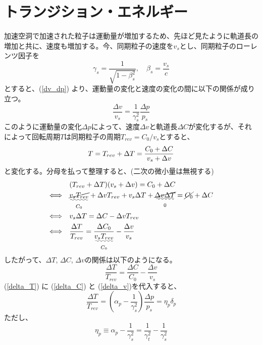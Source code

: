\documentclass[10pt,a4paper]{jlreq}
\begin{document}
\section{トランジション・エネルギー}
加速空洞で加速された粒子は運動量が増加するため、先ほど見たように軌道長の増加と共に、速度も増加する。今、同期粒子の速度を$v_s$とし、同期粒子のローレンツ因子を
%
\begin{equation}
  \gamma_s = \frac{1}{\sqrt{1 - \beta_s^2}}, \quad \beta_s = \frac{v_s}{c}
\end{equation}
%
とすると、(\ref{dv_dp}) より、運動量の変化と速度の変化の間に以下の関係が成り立つ。
%
\begin{equation}
  \frac{\Delta v}{v_s}=\frac{1}{\gamma_s^2}\frac{\Delta p}{p_s}
  \label{delta_v}
\end{equation}
%
このように運動量の変化$\Delta p$によって、速度$\Delta v$と軌道長$\Delta C$が変化するが、それによって回転周期$T$は同期粒子の周期$T_{rev}=C_0/v_s$とすると、
%
\begin{equation}
  T = T_{rev} + \Delta T = \frac{C_0 + \Delta C}{v_s + \Delta v} \notag
\end{equation}
%
と変化する。分母を払って整理すると、(二次の微小量は無視する)
%
\begin{align}
  & (T_{rev} + \Delta T)(v_s + \Delta v) = C_0 + \Delta C \notag \\
  \Longleftrightarrow\quad & \underset{C_0}{\uwave{\cancel{v_s T_{rev}}}} + \Delta v T_{rev} + v_s \Delta T +
  \underset{0}{\uwave{\cancel{\Delta v \Delta T}}}
  = \cancel{C_0} + \Delta C \notag \\
  \Longleftrightarrow\quad & v_s \Delta T = \Delta C- \Delta v T_{rev} \notag \\
  \Longleftrightarrow\quad & \frac{\Delta T}{T_{rev}} = \frac{\Delta C_0}{\underset{C_0}{\uwave{v_s T_{rev}}}} - \frac{\Delta v}{v_s} \notag
\end{align}
%
したがって、$\Delta T$, $\Delta C$, $\Delta v$の関係は以下のようになる。
%
\begin{equation}
  \frac{\Delta T}{T_{rev}} = \frac{\Delta C}{C_0} - \frac{\Delta v}{v_s}
  \label{delta_T}
\end{equation}
%
(\ref{delta_T}) に (\ref{delta_C}) と (\ref{delta_v})を代入すると、
%
\begin{equation}
  \frac{\Delta T}{T_{rev}} = \left(\alpha_p - \frac{1}{\gamma_s^2}\right)\frac{\Delta p}{p_s} = \eta_p \delta_p
  \label{deltat_eta_deltap}
\end{equation}
%
ただし、
%
\begin{equation}
  \eta_p \equiv \alpha_p - \frac{1}{\gamma_s^2} = \frac{1}{\gamma_t^2} - \frac{1}{\gamma_s^2}
  \label{alppha_slip}
\end{equation}
\end{document}
